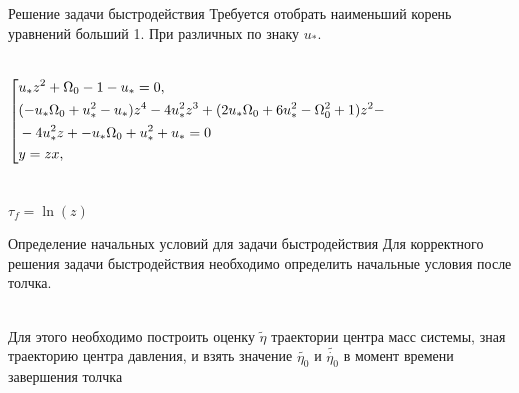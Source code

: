 \documentclass[10pt]{beamer}
\begin{document}
\begin{frame}{Решение задачи быстродействия}
	Требуется отобрать наименьший корень уравнений больший 1. При различных по знаку $u_*$.

		\begin{columns}
			\begin{equation}\label{koshisystem}
				\left[ {\begin{aligned}
					& u_*z^2+\Omega _0-1-u_*=0, \hfill    \\
					& (-u_* \Omega _0+u_*^2-u_*)z^4-4 u_*^2z^3+(2 u_* \Omega _0+6 u_*^2-\Omega _0^2+1)z^2- \hfill \\
					& -4 u_*^2z+-u_* \Omega _0+u_*^2+u_*=0 \hfill    \\
					& y=zx, \hfill                                                                                                              \\
			   \end{aligned}} \right.
			\end{equation}
		\end{columns}
		$\tau_f=\ln(z)$

\end{frame}

\begin{frame}{Определение начальных условий для задачи быстродействия}
	Для корректного решения задачи быстродействия необходимо определить начальные условия после толчка.
	
	\hfill \\
	Для этого необходимо построить оценку $\tilde{\eta}$ траектории центра масс системы, зная траекторию центра давления,
	и взять значение $\tilde{\eta_0}$ и $\tilde{\dot{\eta_0}}$ в момент времени завершения толчка

\end{frame}
\end{document}
